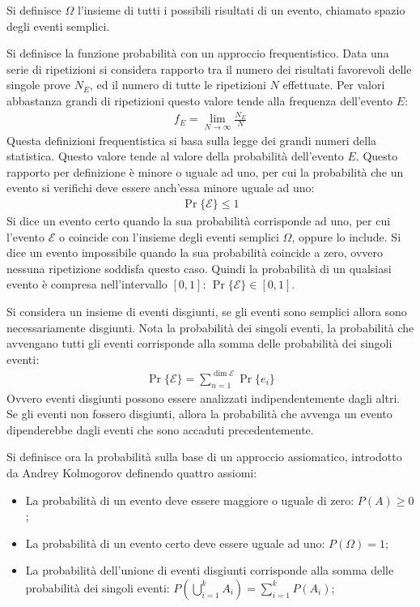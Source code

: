 \documentclass{article}
\numberwithin{equation}{subsection}
\begin{document}
Si definisce $\Omega$ l'insieme di tutti i possibili risultati di un evento, chiamato spazio degli eventi semplici. 

Si definisce la funzione probabilità con un approccio frequentistico. Data una serie di ripetizioni si considera rapporto tra il numero dei risultati favorevoli delle singole prove $N_E$, ed 
il numero di tutte le ripetizioni $N$ effettuate. Per valori abbastanza grandi di ripetizioni questo valore tende alla frequenza dell'evento $E$:
\begin{gather*}
    f_E=\lim_{N\to\infty}\displaystyle\frac{N_E}{N}
\end{gather*}
Questa definizioni frequentistica si basa sulla legge dei grandi numeri della statistica. Questo valore tende al valore della probabilità dell'evento $E$. 
Questo rapporto per definizione è minore o uguale ad uno, per cui la probabilità che un evento si verifichi deve essere anch'essa minore uguale ad uno:
\begin{gather*}
    \Pr\{\mathscr{E}\}\leq1
\end{gather*}
Si dice un evento certo quando la sua probabilità corrisponde ad uno, per cui l'evento $\mathscr{E}$ o coincide con l'insieme degli eventi semplici $\Omega$, oppure lo include. 
Si dice un evento impossibile quando la sua probabilità coincide a zero, ovvero nessuna ripetizione soddisfa questo caso. Quindi la probabilità di un qualsiasi 
evento è compresa nell'intervallo $[0,1]$: $\Pr\{\mathscr{E}\}\in[0,1]$. 

Si considera un insieme di eventi disgiunti, se gli eventi sono semplici allora sono necessariamente disgiunti. Nota la probabilità dei singoli eventi, la probabilità che avvengano 
tutti gli eventi corrisponde alla somma delle probabilità dei singoli eventi:
\begin{gather*}
    \Pr\{\mathscr{E}\}=\displaystyle\sum_{n=1}^{\dim\mathscr{E}}\Pr\{{e}_i\}
\end{gather*}
Ovvero eventi disgiunti possono essere analizzati indipendentemente dagli altri. 
Se gli eventi non fossero disgiunti, allora la probabilità che avvenga un evento dipenderebbe dagli eventi che sono accaduti precedentemente. 


Si definisce ora la probabilità sulla base di un approccio assiomatico, introdotto da Andrey Kolmogorov definendo quattro assiomi:
\begin{itemize}
    \item La probabilità di un evento deve essere maggiore o uguale di zero: $P(A)\geq0$;
    \item La probabilità di un evento certo deve essere uguale ad uno: $P(\Omega)=1$;
    \item La probabilità dell'unione di eventi disgiunti corrisponde alla somma delle probabilità dei singoli eventi: $P\left(\displaystyle\bigcup_{i=1}^kA_i\right)=\displaystyle\sum_{i=1}^kP(A_i)$;
\end{itemize}
\end{document}

